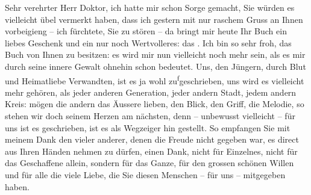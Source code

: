 \pstart{}Sehr verehrter Herr Doktor,\pend\vspace{0.5em}
\pstart
           ich hatte mir schon Sorge gemacht, Sie würden es vielleicht übel vermerkt haben, dass
               ich gestern mit nur raschem Gruss an Ihnen vorbeigieng
               – ich fürchtete, Sie zu stören – da bringt mir heute Ihr Buch ein liebes Geschenk und ein nur noch Wertvolleres: das
                  \label{K_L03622-1v}\label{K_L03622-1}. Ich bin so
               sehr froh, das Buch von Ihnen zu besitzen: es
               wird mir nun vielleicht noch mehr sein, als es mir durch seine innere Gewalt ohnehin
               schon bedeutet. Uns, {\pb}den Jüngern, durch
               Blut und Heimatliebe Verwandten, ist es ja wohl zu\substVorne{}\textsuperscript{f}\substDazwischen{}g\substHinten{}eschrieben, uns wird es
               vielleicht mehr gehören, als jeder anderen Generation, jeder andern Stadt, jedem
               andern Kreis: mögen die andern das Äussere lieben, den Blick, den Griff, die Melodie,
               so stehen wir doch seinem Herzen am nächsten, denn – unbewusst vielleicht – für uns
               ist es geschrieben, ist es als Wegzeiger hin gestellt. So empfangen Sie mit meinem
               Dank den vieler anderer, den\introOben{}en\introOben{} die Freude nicht gegeben
               war, es direct aus Ihren Händen nehmen zu dürfen, einen Dank, nicht für Einzelnes,
               nicht für das Geschaffene allein, sondern für das Ganze, für den grossen schönen
               Willen und für alle die viele Liebe, die Sie diesen Menschen – für uns – mitgegeben
               haben.\pend
           
